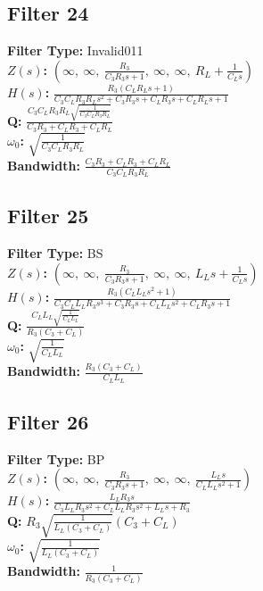 \documentclass{article}
\begin{document}
\subsection*{Filter 24}
\textbf{Filter Type:} Invalid011 \\ 
\textbf{$Z(s)$:} $\left( \infty, \  \infty, \  \frac{R_{3}}{C_{3} R_{3} s + 1}, \  \infty, \  \infty, \  R_{L} + \frac{1}{C_{L} s}\right)$ \\ 
\textbf{$H(s)$:} $\frac{R_{3} \left(C_{L} R_{L} s + 1\right)}{C_{3} C_{L} R_{3} R_{L} s^{2} + C_{3} R_{3} s + C_{L} R_{3} s + C_{L} R_{L} s + 1}$ \\ 
\textbf{Q:} $\frac{C_{3} C_{L} R_{3} R_{L} \sqrt{\frac{1}{C_{3} C_{L} R_{3} R_{L}}}}{C_{3} R_{3} + C_{L} R_{3} + C_{L} R_{L}}$ \\ 
\textbf{$\omega_0$:} $\sqrt{\frac{1}{C_{3} C_{L} R_{3} R_{L}}}$ \\ 
\textbf{Bandwidth:} $\frac{C_{3} R_{3} + C_{L} R_{3} + C_{L} R_{L}}{C_{3} C_{L} R_{3} R_{L}}$ \\ 
\subsection*{Filter 25}
\textbf{Filter Type:} BS \\ 
\textbf{$Z(s)$:} $\left( \infty, \  \infty, \  \frac{R_{3}}{C_{3} R_{3} s + 1}, \  \infty, \  \infty, \  L_{L} s + \frac{1}{C_{L} s}\right)$ \\ 
\textbf{$H(s)$:} $\frac{R_{3} \left(C_{L} L_{L} s^{2} + 1\right)}{C_{3} C_{L} L_{L} R_{3} s^{3} + C_{3} R_{3} s + C_{L} L_{L} s^{2} + C_{L} R_{3} s + 1}$ \\ 
\textbf{Q:} $\frac{C_{L} L_{L} \sqrt{\frac{1}{C_{L} L_{L}}}}{R_{3} \left(C_{3} + C_{L}\right)}$ \\ 
\textbf{$\omega_0$:} $\sqrt{\frac{1}{C_{L} L_{L}}}$ \\ 
\textbf{Bandwidth:} $\frac{R_{3} \left(C_{3} + C_{L}\right)}{C_{L} L_{L}}$ \\ 
\subsection*{Filter 26}
\textbf{Filter Type:} BP \\ 
\textbf{$Z(s)$:} $\left( \infty, \  \infty, \  \frac{R_{3}}{C_{3} R_{3} s + 1}, \  \infty, \  \infty, \  \frac{L_{L} s}{C_{L} L_{L} s^{2} + 1}\right)$ \\ 
\textbf{$H(s)$:} $\frac{L_{L} R_{3} s}{C_{3} L_{L} R_{3} s^{2} + C_{L} L_{L} R_{3} s^{2} + L_{L} s + R_{3}}$ \\ 
\textbf{Q:} $R_{3} \sqrt{\frac{1}{L_{L} \left(C_{3} + C_{L}\right)}} \left(C_{3} + C_{L}\right)$ \\ 
\textbf{$\omega_0$:} $\sqrt{\frac{1}{L_{L} \left(C_{3} + C_{L}\right)}}$ \\ 
\textbf{Bandwidth:} $\frac{1}{R_{3} \left(C_{3} + C_{L}\right)}$ \\ 
\end{document}
